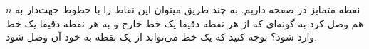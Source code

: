 \documentclass[12pt,onecolumn,a4paper]{article}
\begin{document}
   $n$
   نقطه متمایز
   در صفحه داریم. به چند طریق میتوان این نقاط را با خطوط جهت‌دار به هم وصل کرد به گونه‌ای که از هر نقطه دقیقا یک خط خارج و به هر نقطه دقیقا یک خط وارد شود؟ توجه کنید که یک خط می‌تواند از یک نقطه به خود آن وصل شود. 
\end{document}
